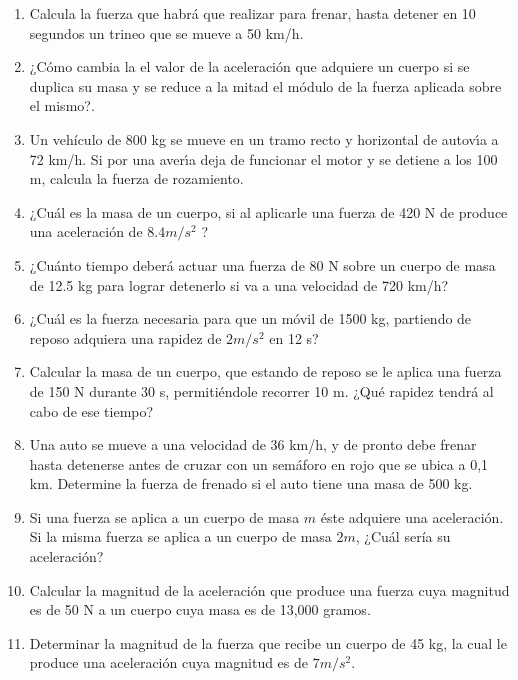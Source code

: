 \begin{enumerate}
\item Calcula la fuerza que habrá que realizar para frenar, hasta detener en 10 segundos un trineo que se mueve a 50 km/h.

\item ¿Cómo cambia la el valor de la aceleración que adquiere un cuerpo si se duplica su masa y se reduce a la mitad el módulo de 
la fuerza aplicada sobre el mismo?.

\item Un vehículo de 800 kg se mueve en un tramo recto y horizontal de autovı́a a 72 km/h. Si por una averı́a deja de funcionar 
el motor y se detiene a los 100 m, calcula la fuerza de rozamiento.

\item ¿Cuál es la masa de un cuerpo, si al aplicarle una fuerza de 420 N de produce una aceleración de $8.4 m/s^2$ ?

\item ¿Cuánto tiempo deberá actuar una fuerza de 80 N sobre un cuerpo de masa de 12.5 kg para lograr detenerlo si va a una 
velocidad de 720 km/h?

\item ¿Cuál es la fuerza necesaria para que un móvil de 1500 kg, partiendo de reposo adquiera una rapidez de $2 m/s^2$ en 12 s?

\item Calcular la masa de un cuerpo, que estando de reposo se le aplica una fuerza de 150 N durante 30 s, permitiéndole recorrer 
10 m. ¿Qué rapidez tendrá al cabo de ese tiempo?

\item  Una auto se mueve a una 
velocidad de 36 km/h, y de pronto debe frenar hasta detenerse antes de cruzar con un semáforo en 
rojo que se ubica a 0,1 km. Determine la fuerza de frenado si el auto tiene una masa de 500 kg.

\item  Si una fuerza se aplica a un 
cuerpo de masa $m$ éste adquiere una aceleración. Si la misma fuerza se aplica a un cuerpo 
de 
masa $2m$, ¿Cuál sería su aceleración?

\item Calcular la magnitud de la aceleración que produce una fuerza cuya magnitud es de 50 N a un cuerpo cuya masa es de 13,000 
gramos.

\item Determinar la magnitud de la fuerza que recibe un cuerpo de 45 kg, la cual le produce una aceleración cuya magnitud es de 
$7 
m/s^2$.


\end{enumerate}
